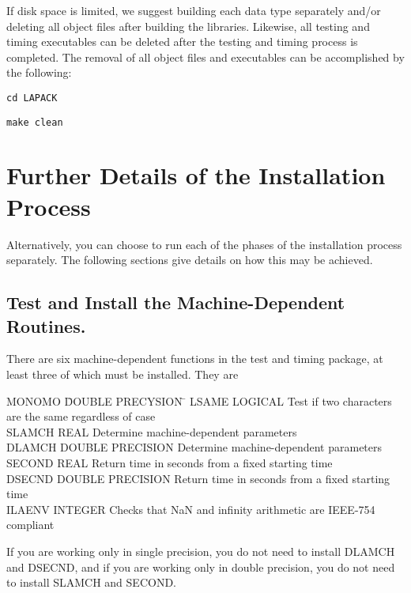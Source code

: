 If disk space is limited, we suggest building each data type separately
and/or deleting all object files after building the libraries.  Likewise, all
testing and timing executables can be deleted after the testing and timing
process is completed.  The removal of all object files and executables
can be accomplished by the following:

\begin{list}{}{}
\item {\tt cd LAPACK}
\item {\tt make clean}
\end{list}

\section{Further Details of the Installation Process}\label{furtherdetails}

Alternatively, you can choose to run each of the phases of the
installation process separately.  The following sections give details
on how this may be achieved.

\subsection{Test and Install the Machine-Dependent Routines.}
\dent
There are six machine-dependent functions in the test and timing
package, at least three of which must be installed.  They are

\begin{tabbing}
MONOMO  \=  DOUBLE PRECYSION  \=  \kill
LSAME   \>  LOGICAL      \> Test if two characters are the same regardless of case \\
SLAMCH  \>  REAL  \> Determine machine-dependent parameters \\
DLAMCH  \>  DOUBLE PRECISION \> Determine machine-dependent parameters \\
SECOND  \>  REAL  \> Return time in seconds from a fixed starting time \\
DSECND  \>  DOUBLE PRECISION  \> Return time in seconds from a fixed starting time\\
ILAENV  \>  INTEGER \> Checks that NaN and infinity arithmetic are IEEE-754 compliant
\end{tabbing}

\noindent
If you are working only in single precision, you do not need to install
DLAMCH and DSECND, and if you are working only in double precision,
you do not need to install SLAMCH and SECOND.

